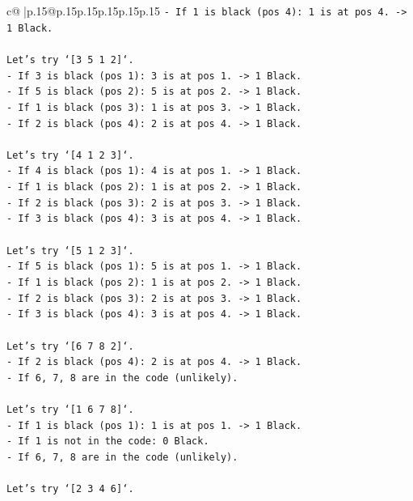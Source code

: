 \documentclass{article}
\begin{document}
{\begin{supertabular}{c@{$\;$}|p{.15\linewidth}@{}p{.15\linewidth}p{.15\linewidth}p{.15\linewidth}p{.15\linewidth}p{.15\linewidth}}
{{{\texttt{{-} If 1 is black (pos 4): 1 is at pos 4. {-}> 1 Black.} \\
\\ 
\texttt{Let's try `{[}3 5 1 2{]}`.} \\
\texttt{{-} If 3 is black (pos 1): 3 is at pos 1. {-}> 1 Black.} \\
\texttt{{-} If 5 is black (pos 2): 5 is at pos 2. {-}> 1 Black.} \\
\texttt{{-} If 1 is black (pos 3): 1 is at pos 3. {-}> 1 Black.} \\
\texttt{{-} If 2 is black (pos 4): 2 is at pos 4. {-}> 1 Black.} \\
\\ 
\texttt{Let's try `{[}4 1 2 3{]}`.} \\
\texttt{{-} If 4 is black (pos 1): 4 is at pos 1. {-}> 1 Black.} \\
\texttt{{-} If 1 is black (pos 2): 1 is at pos 2. {-}> 1 Black.} \\
\texttt{{-} If 2 is black (pos 3): 2 is at pos 3. {-}> 1 Black.} \\
\texttt{{-} If 3 is black (pos 4): 3 is at pos 4. {-}> 1 Black.} \\
\\ 
\texttt{Let's try `{[}5 1 2 3{]}`.} \\
\texttt{{-} If 5 is black (pos 1): 5 is at pos 1. {-}> 1 Black.} \\
\texttt{{-} If 1 is black (pos 2): 1 is at pos 2. {-}> 1 Black.} \\
\texttt{{-} If 2 is black (pos 3): 2 is at pos 3. {-}> 1 Black.} \\
\texttt{{-} If 3 is black (pos 4): 3 is at pos 4. {-}> 1 Black.} \\
\\ 
\texttt{Let's try `{[}6 7 8 2{]}`.} \\
\texttt{{-} If 2 is black (pos 4): 2 is at pos 4. {-}> 1 Black.} \\
\texttt{{-} If 6, 7, 8 are in the code (unlikely).} \\
\\ 
\texttt{Let's try `{[}1 6 7 8{]}`.} \\
\texttt{{-} If 1 is black (pos 1): 1 is at pos 1. {-}> 1 Black.} \\
\texttt{{-} If 1 is not in the code: 0 Black.} \\
\texttt{{-} If 6, 7, 8 are in the code (unlikely).} \\
\\ 
\texttt{Let's try `{[}2 3 4 6{]}`.} \\
}}}
\end{supertabular}}
\end{document}
